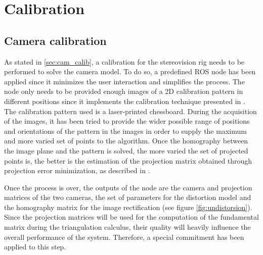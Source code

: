 \chapter{Calibration} %
\label{cha:calibration}

\section{Camera calibration} %
\label{sec:camera_calibration}
As stated in \ref{sec:cam_calib}, a calibration for the stereovision rig needs to be performed to solve the camera model.
To do so, a predefined ROS node has been applied since it minimizes the user interaction and simplifies the process. 
The node only needs to be provided enough images of a 2D calibration pattern in different positions since it implements the calibration technique presented in \cite{Zhang}. 
The calibration pattern used is a laser-printed chessboard. 
During the acquisition of the images, it has been tried to provide the wider possible range of positions and orientations of the pattern in the images in order to supply the maximum and more varied set of points to the algorithm.
Once the homography between the image plane and the pattern is solved, the more varied the set of projected points is, the better is the estimation of the projection matrix obtained through projection error minimization, as described in \cite{Hartley}. 

Once the process is over, the outputs of the node are the camera and projection matrices of the two cameras, the set of parameters for the distortion model and the homography matrix for the image rectification (see figure \ref{fig:undistorsion}).
Since the projection matrices will be used for the computation of the fundamental matrix during the triangulation calculus, their quality will heavily influence the overall performance of the system. 
Therefore, a special commitment has been applied to this step. 

